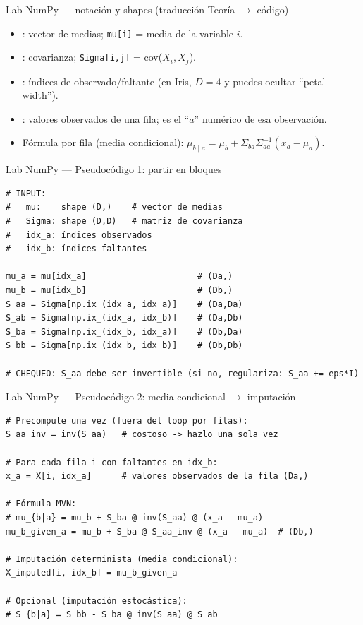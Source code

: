 \begin{frame}{Lab NumPy — notación y shapes (traducción Teoría \(\rightarrow\) código)}
\small
\begin{itemize}
  \item {}: vector de medias; \texttt{mu[i]} = media de la variable \(i\).
  \item {}: covarianza; \texttt{Sigma[i,j]} = cov(\(X_i,X_j\)).
  \item {}: índices de observado/faltante (en Iris, \(D=4\) y puedes ocultar “petal width”). 
  \item {}: valores observados de una fila; es el “\(a\)” numérico de esa observación.
  \item Fórmula por fila (media condicional): \(\mu_{b\mid a}=\mu_b+\Sigma_{ba}\Sigma_{aa}^{-1}(x_a-\mu_a)\).
\end{itemize}
\end{frame}

\begin{frame}[fragile]{Lab NumPy — Pseudocódigo 1: partir en bloques}
\begin{verbatim}
# INPUT:
#   mu:    shape (D,)    # vector de medias
#   Sigma: shape (D,D)   # matriz de covarianza
#   idx_a: índices observados
#   idx_b: índices faltantes

mu_a = mu[idx_a]                      # (Da,)
mu_b = mu[idx_b]                      # (Db,)
S_aa = Sigma[np.ix_(idx_a, idx_a)]    # (Da,Da)
S_ab = Sigma[np.ix_(idx_a, idx_b)]    # (Da,Db)
S_ba = Sigma[np.ix_(idx_b, idx_a)]    # (Db,Da)
S_bb = Sigma[np.ix_(idx_b, idx_b)]    # (Db,Db)

# CHEQUEO: S_aa debe ser invertible (si no, regulariza: S_aa += eps*I)
\end{verbatim}
\end{frame}

\begin{frame}[fragile]{Lab NumPy — Pseudocódigo 2: media condicional \(\rightarrow\) imputación}
\begin{verbatim}
# Precompute una vez (fuera del loop por filas):
S_aa_inv = inv(S_aa)   # costoso -> hazlo una sola vez

# Para cada fila i con faltantes en idx_b:
x_a = X[i, idx_a]      # valores observados de la fila (Da,)

# Fórmula MVN:
# mu_{b|a} = mu_b + S_ba @ inv(S_aa) @ (x_a - mu_a)
mu_b_given_a = mu_b + S_ba @ S_aa_inv @ (x_a - mu_a)  # (Db,)

# Imputación determinista (media condicional):
X_imputed[i, idx_b] = mu_b_given_a

# Opcional (imputación estocástica):
# S_{b|a} = S_bb - S_ba @ inv(S_aa) @ S_ab
\end{verbatim}
\end{frame}

